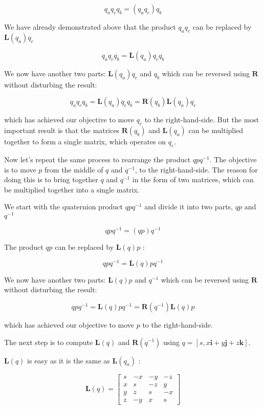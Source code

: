 $$
q_{a} q_{c} q_{b}=\left(q_{a} q_{c}\right) q_{b}
$$

We have already demonstrated above that the product $q_{a} q_{c}$ can be replaced by $\mathbf{L}\left(q_{a}\right) q_{c}$

$$
q_{a} q_{c} q_{b}=\mathbf{L}\left(q_{a}\right) q_{c} q_{b}
$$

We now have another two parts: $\mathbf{L}\left(q_{a}\right) q_{c}$ and $q_{b}$ which can be reversed using $\mathbf{R}$ without disturbing the result:

$$
q_{a} q_{c} q_{b}=\mathbf{L}\left(q_{a}\right) q_{c} q_{b}=\mathbf{R}\left(q_{b}\right) \mathbf{L}\left(q_{a}\right) q_{c}
$$

which has achieved our objective to move $q_{c}$ to the right-hand-side. But the most important result is that the matrices $\mathbf{R}\left(q_{b}\right)$ and $\mathbf{L}\left(q_{a}\right)$ can be multiplied together to form a single matrix, which operates on $q_{c}$.

Now let's repeat the same process to rearrange the product $q p q^{-1}$. The objective is to move $p$ from the middle of $q$ and $q^{-1}$, to the right-hand-side. The reason for doing this is to bring together $q$ and $q^{-1}$ in the form of two matrices, which can be multiplied together into a single matrix.

We start with the quaternion product $q p q^{-1}$ and divide it into two parts, $q p$ and $q^{-1}$

$$
q p q^{-1}=(q p) q^{-1}
$$

The product $q p$ can be replaced by $\mathbf{L}(q) p$ :

$$
q p q^{-1}=\mathbf{L}(q) p q^{-1}
$$

We now have another two parts: $\mathbf{L}(q) p$ and $q^{-1}$ which can be reversed using $\mathbf{R}$ without disturbing the result:

$$
q p q^{-1}=\mathbf{L}(q) p q^{-1}=\mathbf{R}\left(q^{-1}\right) \mathbf{L}(q) p
$$

which has achieved our objective to move $p$ to the right-hand-side.

The next step is to compute $\mathbf{L}(q)$ and $\mathbf{R}\left(q^{-1}\right)$ using $q=[s, x \mathbf{i}+y \mathbf{j}+z \mathbf{k}]$.

$\mathbf{L}(q)$ is easy as it is the same as $\mathbf{L}\left(q_{a}\right)$ :

$$
\mathbf{L}(q)=\left[\begin{array}{cccc}
s & -x & -y & -z \\
x & s & -z & y \\
y & z & s & -x \\
z & -y & x & s
\end{array}\right]
$$

